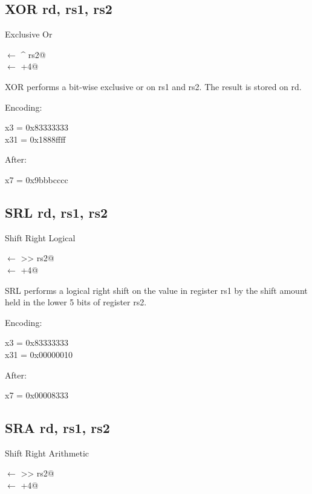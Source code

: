 \subsection{XOR rd, rs1, rs2}

Exclusive Or

\verb@rd@ $\leftarrow$  ^ rs2@\\
\verb@pc@ $\leftarrow$ \verb@pc+4@

XOR performs a bit-wise exclusive or on rs1 and rs2.  
The result is stored on rd.

Encoding:


x3  = 0x83333333\\
x31 = 0x1888ffff

After:

x7 = 0x9bbbcccc

\subsection{SRL rd, rs1, rs2}

Shift Right Logical

\verb@rd@ $\leftarrow$  >> rs2@\\
\verb@pc@ $\leftarrow$ \verb@pc+4@

SRL performs a logical right shift on the value in register rs1 by 
the shift amount held in the lower 5 bits of 
register rs2.~\cite[p.~15]{rvismv1v22:2017}

Encoding:


x3  = 0x83333333\\
x31 = 0x00000010

After:

x7 = 0x00008333

\subsection{SRA rd, rs1, rs2}

Shift Right Arithmetic

\verb@rd@ $\leftarrow$  >> rs2@\\
\verb@pc@ $\leftarrow$ \verb@pc+4@

